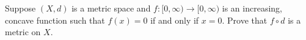 {\item Suppose $(X,d)$ is a metric space and $f: [0, \infty) \to [0, \infty)$ is an increasing, concave function such that $f(x) = 0$ if and only if $x=0$. Prove that $f \circ d$ is a metric on $X$. 

\ea

\begin{comment}

\ExerciseSolution 

\ba

\item Let $x$ and $y$ be in $[-1,1]$ and let $\alpha$ be between $0$ and $1$. Since $\alpha$ and $1-\alpha$ are both between $0$ and $1$, and $(x-y)^2 \geq 0$, we have that 
\begin{align*}
\alpha(1-\alpha)(x-y)^2 &\geq 0 \\
(\alpha-\alpha^2)(x^2-2xy+y^2)  &\geq 0 \\
\alpha(x^2-2xy+y^2) - \alpha^2(x^2-2xy+y^2) &\geq 0 \\
\alpha x^2 - \alpha^2x^2 - 2 \alpha xy + 2\alpha^2xy - \alpha^2y^2 + \alpha y^2 &\geq 0 \\
 \big( -x^2 +2 \alpha x^2 - \alpha^2 x^2 -  2 \alpha xy + 2\alpha^2xy - \alpha^2y^2 \big)  + (x^2 - \alpha x^2 + \alpha y^2) &\geq 0 \\
  \big( -(1-\alpha)^2x^2 - 2\alpha(1-\alpha)xy - \alpha^2y^2 \big) + (x^2 - \alpha x^2 + \alpha y^2) &\geq 0 \\
  -((1-\alpha)x + \alpha y)^2 -((1-\alpha)(-x^2) + \alpha (-y^2)) &\geq 0 \\
f((1-\alpha)x + \alpha y) - ((1-\alpha)f(x) + \alpha f(y)) &\geq 0  \\
f((1-\alpha)x + \alpha y)  &\geq (1-\alpha)f(x) + \alpha f(y).
\end{align*}

So $f$ is concave on $[-1,1]$. Note that this argument doesn't depend on $x$ and $y$ begin in the interval $[-1,1]$, so $f$ is concave on any interval. 

\item First note that if $y=0$ we have 
\[f(tx) \geq tf(x) + (1-t) f(y) \geq tf(x)\]
for all $x \in [0,\infty)$ and all $t \in [0,1]$. 
Let $a, b \in [0, \infty)$ with $a \neq b$. Then 
\[f(a)+f(b) = f\left(\frac{a}{a+b}(a+b)\right) + f\left(\frac{b}{a+b}(a+b)\right) \geq \frac{a}{a+b}f(a+b) + \frac{a}{a+b}f(a+b) = f(a+b).\]

\item Let $x, y, z \in X$. Since the codomain of both $f$ and $d$ is the set of non-negative real numbers, we conclude that $(f \circ d)(x,y) \geq 0$. Also,
\[(f \circ d)(x,y) = f(d(x,y)) = f(d(y,x)) = (f \circ d)(y,x)\]
and $f \circ d$ is symmetric. 


\end{comment}}
